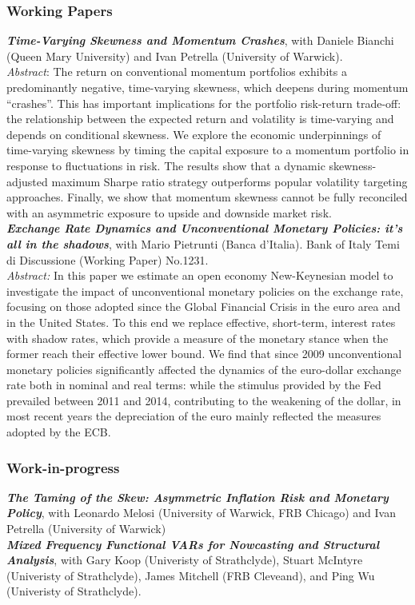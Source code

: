 \documentclass[a4paper,12pt]{article}
\begin{document}
\subsubsection*{Working Papers}
\textit{\textbf{Time-Varying Skewness and Momentum Crashes}}, with Daniele Bianchi (Queen Mary University) and Ivan Petrella (University of Warwick).\\[.5em]\textit{Abstract}:
The return on conventional momentum portfolios exhibits a predominantly negative, time-varying skewness, which deepens during momentum ``crashes''. This has important implications for the portfolio risk-return trade-off: the relationship between the expected return and volatility is time-varying and depends on conditional skewness. We explore the economic underpinnings of time-varying skewness by timing the capital exposure to a momentum portfolio in response to fluctuations in risk. The results show that a dynamic skewness-adjusted maximum Sharpe ratio strategy outperforms popular volatility targeting approaches. Finally, we show that momentum skewness cannot be fully reconciled with an asymmetric exposure to upside and downside market risk.\\[.5em]

\textit{\textbf{Exchange Rate Dynamics and Unconventional Monetary Policies: it’s all in the shadows}}, with Mario Pietrunti (Banca d'Italia). Bank of Italy Temi di Discussione (Working Paper) No.1231.\\[.5em]
\textit{Abstract:} In this paper we estimate an open economy New-Keynesian model to investigate the impact of unconventional monetary policies on the exchange rate, focusing on those adopted since the Global Financial Crisis in the euro area and in the United States. To this end we replace effective, short-term, interest rates with shadow rates, which provide a measure of the monetary stance when the former reach their effective lower bound.
We find that since 2009 unconventional monetary policies significantly affected the dynamics of the euro-dollar exchange rate both in nominal and real terms: while the stimulus provided by the Fed prevailed between 2011 and 2014, contributing to the weakening of the dollar, in most recent years the depreciation of the euro mainly reflected the measures adopted by the ECB.
\subsubsection*{Work-in-progress}
\textit{\textbf{The Taming of the Skew: Asymmetric Inflation Risk and Monetary Policy}}, with Leonardo Melosi (University of Warwick, FRB Chicago) and Ivan Petrella (University of Warwick)\\[.5em]
\textit{\textbf{Mixed Frequency Functional VARs for Nowcasting and Structural Analysis}}, with Gary Koop (Univeristy of Strathclyde), Stuart McIntyre (Univeristy of Strathclyde), James Mitchell (FRB Cleveand), and Ping Wu (Univeristy of Strathclyde).
\end{document}
